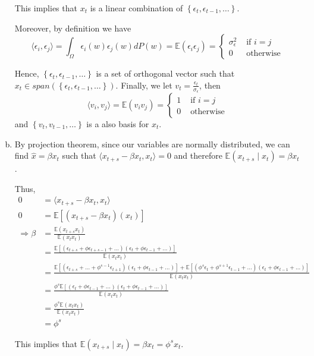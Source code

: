 \documentclass[12pt]{article}
\theoremstyle{definition}
\newcommand\E{\mathbb{E}}
\newcommand{\inp}[2]{\langle #1, #2 \rangle}
\newcommand{\cbra}[1]{\left\{#1\right\}}
\newcommand{\mat}[1]{\begin{matrix}#1\end{matrix}}
\begin{document}
\begin{enumerate}[(a)]
	This implies that $x_t$ is a linear combination of $\cbra{\epsilon_t,\epsilon_{t-1},\dots}$.
	
	Moreover, by definition we have
	\[
	\inp{\epsilon_i}{\epsilon_j} = \int_{\Omega} \epsilon_i(w)\epsilon_j(w)dP(w)= \E(\epsilon_i\epsilon_j) = \left\lbrace \mat{\sigma_\epsilon^2 &\text{ if } i=j\\
	0 & \text{ otherwise}}\right.	
\]

Hence, $\cbra{\epsilon_t,\epsilon_{t-1},\dots}$ is a set of orthogonal vector such that $x_t\in span(\cbra{\epsilon_t,\epsilon_{t-1},\dots})$. Finally, we let $v_t = \frac{\epsilon_t}{\sigma_\epsilon}$, then 
\[
\inp{v_i}{v_j} =  \E(v_iv_j) = \left\lbrace \mat{1 &\text{ if } i=j\\
	0 & \text{ otherwise}}\right.	
\]
and $\cbra{v_t,v_{t-1},\dots}$ is a also basis for $x_t$.
	\item
	
	By projection theorem, since our variables are normally distributed, we can find $\hat{x} = \beta x_t$ such that $\inp{x_{t+s}-\beta x_t}{x_t} =0$ and therefore $\E(x_{t+s}\mid x_t)=\beta x_t$.
	
	Thus,
		\begin{align*}
		0& = \inp{x_{t+s}-\beta x_t}{x_t}\\
		0& = \E[({x_{t+s}-\beta x_t})({x_t})] \\
		\Rightarrow \beta & = \frac{\E(x_{t+s}x_t)}{\E(x_{t}x_t)} \\
		& = \frac{\E[(\epsilon_{t+s}+\phi\epsilon_{t+s-1}+\dots)(\epsilon_{t}+\phi\epsilon_{t-1}+\dots)]}{\E(x_{t}x_t)}\\
		& = \frac{\E[(\epsilon_{t+s}+\dots+\phi^{s-1}\epsilon_{t+1})(\epsilon_{t}+\phi\epsilon_{t-1}+\dots)]+\E[(\phi^s\epsilon_{t}+\phi^{s+1}\epsilon_{t-1}+\dots)(\epsilon_{t}+\phi\epsilon_{t-1}+\dots)]}{\E(x_{t}x_t)}\\
		& = \frac{\phi^s\E[(\epsilon_{t}+\phi\epsilon_{t-1}+\dots)(\epsilon_{t}+\phi\epsilon_{t-1}+\dots)]}{\E(x_{t}x_t)}\\
		& = \frac{\phi^s\E(x_{t}x_t)}{\E(x_{t}x_t)}\\
		& = \phi^s
	\end{align*}

	
		
	This implies that $\E(x_{t+s}\mid x_t) = \beta x_t = \phi^s x_t$.
\end{enumerate}
\end{document}
